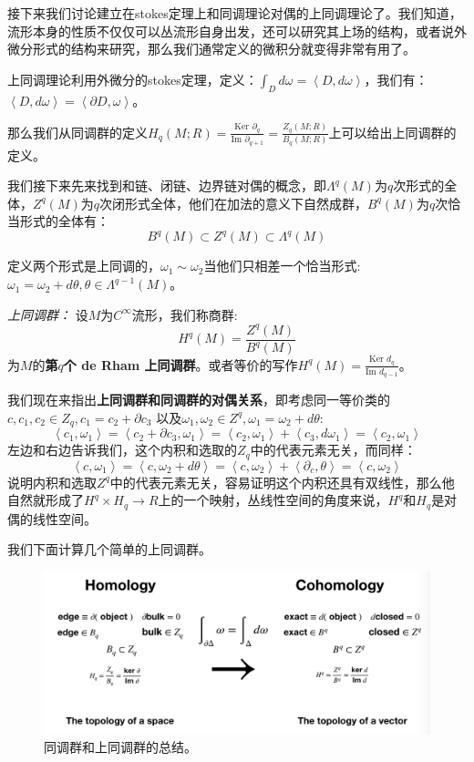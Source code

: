 \documentclass[supercite]{HustGraduPaper}
\newcommand{\avg}[1]{\left\langle #1 \right\rangle}
\begin{document}
\begin{appendices}
		接下来我们讨论建立在stokes定理上和同调理论对偶的上同调理论了。我们知道，流形本身的性质不仅仅可以丛流形自身出发，还可以研究其上场的结构，或者说外微分形式的结构来研究，那么我们通常定义的微积分就变得非常有用了。
		
		上同调理论利用外微分的stokes定理，定义：$\int_D d\omega = \avg{D,d\omega}$，我们有：$\avg{D,d\omega} = \avg{\partial D,\omega}$。
		
		那么我们从同调群的定义$H_q(M;R) = \frac{\text{Ker }\partial_q}{\text{Im }\partial_{q+1}} = \frac{Z_q(M;R)}{B_q(M;R)}$上可以给出上同调群的定义。
		
		我们接下来先来找到和链、闭链、边界链对偶的概念，即$\Lambda^q(M)$为$q$次形式的全体，$Z^q(M)$为$q$次闭形式全体，他们在加法的意义下自然成群，$B^q(M)$为$q$次恰当形式的全体有：
		\begin{equation}
		B^q(M) \subset Z^q(M) \subset \Lambda^q(M)
		\end{equation}
		
		定义两个形式是上同调的，$\omega_1 \sim \omega_2$当他们只相差一个恰当形式:$\omega_1 = \omega_2 + d\theta, \theta \in \Lambda^{q-1}(M)$。
		
		\textit{上同调群：} 设$M$为$C^\infty$流形，我们称商群:
		\begin{equation}
		H^q(M) = \frac{Z^q(M)}{B^q(M)}
		\end{equation}
		为$M$的\textbf{第$q$个 de Rham 上同调群}。或者等价的写作$H^q(M) = \frac{\text{Ker }d_q}{\text{Im }d_{q-1}}$。
		
		我们现在来指出\textbf{上同调群和同调群的对偶关系}，即考虑同一等价类的$c,c_1,c_2 \in Z_q, c_1 = c_2 + \partial c_3$ 以及$\omega_1,\omega_2 \in Z^q, \omega_1 = \omega_2 + d\theta$:
		\begin{equation}
		\avg{c_1,\omega_1} = \avg{c_2 + \partial c_3,\omega_1} = \avg{c_2,\omega_1} + \avg{c_3, d\omega_1} = \avg{c_2,\omega_1}
		\end{equation}
		左边和右边告诉我们，这个内积和选取的$Z_q$中的代表元素无关，而同样：
		\begin{equation}
		\avg{c,\omega_1} = \avg{c,\omega_2 + d\theta} = \avg{c,\omega_2} + \avg{\partial_c,\theta} = \avg{c,\omega_2}
		\end{equation}
		说明内积和选取$Z^q$中的代表元素无关，容易证明这个内积还具有双线性，那么他自然就形成了$H^q \times H_q \to R$上的一个映射，丛线性空间的角度来说，$H^q$和$H_q$是对偶的线性空间。
		
		我们下面计算几个简单的上同调群。
		\begin{figure}
			\centering
			\includegraphics[width=0.7\linewidth]{Figures/screenshot003}
			\caption{同调群和上同调群的总结。}
			\label{fig:screenshot003}
		\end{figure}
		

\end{appendices}
\end{document}
